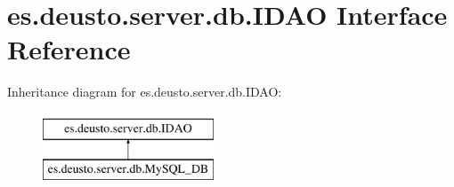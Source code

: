 \hypertarget{interfacees_1_1deusto_1_1server_1_1db_1_1_i_d_a_o}{}\section{es.\+deusto.\+server.\+db.\+I\+D\+AO Interface Reference}
\label{interfacees_1_1deusto_1_1server_1_1db_1_1_i_d_a_o}
Inheritance diagram for es.\+deusto.\+server.\+db.\+I\+D\+AO\+:\begin{figure}[H]
\begin{center}
\leavevmode
\includegraphics[height=2.000000cm]{interfacees_1_1deusto_1_1server_1_1db_1_1_i_d_a_o}
\end{center}
\end{figure}

